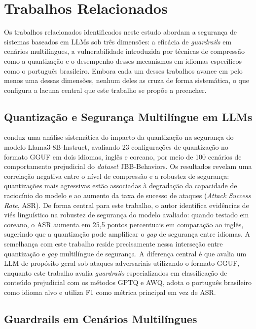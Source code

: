 \chapter{Trabalhos Relacionados}
\label{cap:trabalhos-relacionados}

Os trabalhos relacionados identificados neste estudo abordam a segurança de sistemas baseados em LLMs sob três dimensões: a eficácia de \textit{guardrails} em cenários multilíngues, a vulnerabilidade introduzida por técnicas de compressão como a quantização e o desempenho desses mecanismos em idiomas específicos como o português brasileiro. Embora cada um desses trabalhos avance em pelo menos uma dessas dimensões, nenhum deles as cruza de forma sistemática, o que configura a lacuna central que este trabalho se propõe a preencher.

\section{Quantização e Segurança Multilíngue em LLMs}
\label{sec:jaesik}

 conduz uma análise sistemática do impacto da quantização na segurança do modelo Llama3-8B-Instruct, avaliando 23 configurações de quantização no formato GGUF em dois idiomas, inglês e coreano, por meio de 100 cenários de comportamento prejudicial do \textit{dataset} JBB-Behaviors. Os resultados revelam uma correlação negativa entre o nível de compressão e a robustez de segurança: quantizações mais agressivas estão associadas à degradação da capacidade de raciocínio do modelo e ao aumento da taxa de sucesso de ataques (\textit{Attack Success Rate}, ASR). De forma central para este trabalho, o autor identifica evidências de viés linguístico na robustez de segurança do modelo avaliado: quando testado em coreano, o ASR aumenta em 25,5 pontos percentuais em comparação ao inglês, sugerindo que a quantização pode amplificar o \textit{gap} de segurança entre idiomas. A semelhança com este trabalho reside precisamente nessa interseção entre quantização e \textit{gap} multilíngue de segurança. A diferença central é que  avalia um LLM de propósito geral sob ataques adversariais utilizando o formato GGUF, enquanto este trabalho avalia \textit{guardrails} especializados em classificação de conteúdo prejudicial com os métodos GPTQ e AWQ, adota o português brasileiro como idioma alvo e utiliza F1 como métrica principal em vez de ASR.


\section{Guardrails em Cenários Multilíngues}
\label{sec:yang}

